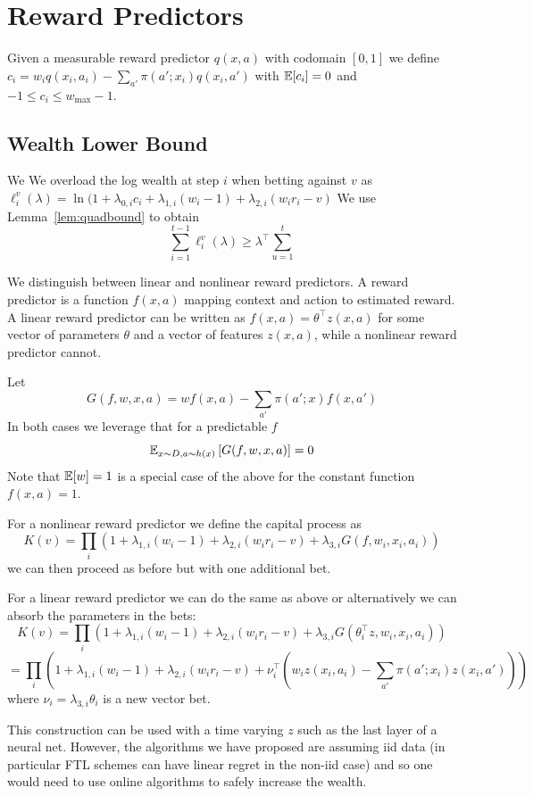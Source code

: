 \section{Reward Predictors}
\label{app:reward-predictors}
Given a measurable reward predictor $q(x,a)$ 
with codomain $[0,1]$ we define
$
c_i = w_i q(x_i,a_i) - \sum_{a'} \pi(a';x_i)q(x_i,a')
$ 
with $\mathbb{E}[c_i]=0$ and $-1\leq c_i \leq w_{\max}-1$.

\subsection{Wealth Lower Bound}
We 
We overload the log wealth at step $i$ when betting against $v$ as 
$\ell_i^v(\lambda) = \ln(1+\lambda_{0,i} c_i + \lambda_{1,i}(w_i-1) + \lambda_{2,i}(w_i r_i -v)$
We use Lemma~\ref{lem:quadbound} to obtain
\[
\sum_{i=1}^{t-1} \ell_i^v(\lambda) \geq \lambda^\top \sum_{u=1}^{t} 
\]

We distinguish between linear and nonlinear reward predictors.
A reward predictor is a function $f(x,a)$ mapping
context and action to estimated reward. A linear 
reward predictor can be written
as $f(x,a)=\theta^\top z(x,a)$ for some vector of parameters
$\theta$ and a vector of features $z(x,a)$, while a 
nonlinear reward predictor cannot. 

Let
\[
G(f,w,x,a)= w f(x,a) - \sum_{a'} \pi(a';x) f(x,a')
\]
In both cases we leverage that for a predictable $f$
\[
\mathbb{E}_{x\sim D,a\sim h(x)}\left[G(f,w,x,a)\right] = 0
\]
Note that $\mathbb{E}[w]=1$ is a special case of the above 
for the constant function $f(x,a)=1$. 

For a nonlinear reward predictor we define the capital 
process as
\[
K(v)=\prod_{i} \left(1+\lambda_{1,i} (w_i -1) 
+ \lambda_{2,i} (w_i r_i -v) 
+ \lambda_{3,i} G(f,w_i,x_i,a_i)\right)
\]
we can then proceed as before but with one additional
bet.

For a linear reward predictor we can do the same
as above or alternatively we can absorb the 
parameters in the bets:
\[
K(v)=\prod_{i} \left(1+\lambda_{1,i} (w_i -1) 
+ \lambda_{2,i} (w_i r_i -v) 
+ \lambda_{3,i} G(\theta_i^\top z, w_i,x_i,a_i)\right)
\]
\[
=\prod_{i} \left(1+\lambda_{1,i} (w_i -1) 
+ \lambda_{2,i} (w_i r_i -v) 
+ \nu_i^\top \left(w_i z(x_i,a_i) - \sum_{a'} \pi(a';x_i) z(x_i,a') \right)\right)
\]
where $\nu_i = \lambda_{3,i}\theta_i$ is a new vector bet.

This construction can be used with a time varying $z$
such as the last layer of a neural net. However, the algorithms
we have proposed are assuming iid data (in particular FTL schemes
can have linear regret in the non-iid case) and so one would need to use online algorithms to safely increase the wealth.


